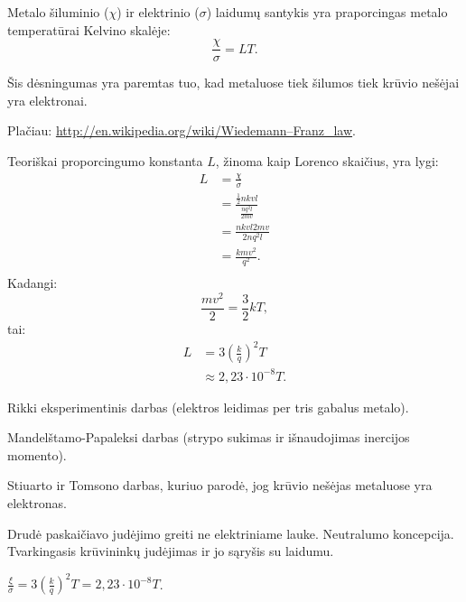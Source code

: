 \begin{defn}
  Metalo šiluminio ($\chi$) ir elektrinio ($\sigma$) laidumų santykis
  yra praporcingas metalo temperatūrai Kelvino skalėje:
  \begin{equation*}
    \frac{\chi}{\sigma} = LT.
  \end{equation*}

  Šis dėsningumas yra paremtas tuo, kad metaluose tiek šilumos tiek
  krūvio nešėjai yra elektronai.

  Plačiau: \url{http://en.wikipedia.org/wiki/Wiedemann–Franz_law}.
\end{defn}

Teoriškai proporcingumo konstanta $L$, žinoma kaip Lorenco skaičius,
yra lygi:
\begin{align*}
  L
  &= \frac{\chi}{\sigma} \\
  &= \frac{\frac{1}{2}nkvl}{\frac{nq^{2}l}{2mv}} \\
  &= \frac{nkvl2mv}{2nq^{2}l} \\
  &= \frac{kmv^{2}}{q^{2}}. \\
\end{align*}
Kadangi:
\begin{equation*}
  \frac{mv^{2}}{2} = \frac{3}{2}kT,
\end{equation*}
tai:
\begin{align*}
  L
  &= 3 \left( \frac{k}{q} \right)^{2}T \\
  &\approx 2,23 \cdot 10^{-8} T.
\end{align*}

\begin{remember}
  \item Rikki eksperimentinis darbas (elektros leidimas per tris
    gabalus metalo).
  \item Mandelštamo-Papaleksi darbas (strypo sukimas ir išnaudojimas
    inercijos momento).
  \item Stiuarto ir Tomsono darbas, kuriuo parodė, jog krūvio nešėjas
    metaluose yra elektronas.
  \item Drudė paskaičiavo judėjimo greiti ne elektriniame lauke.
    Neutralumo koncepcija. Tvarkingasis krūvininkų judėjimas ir
    jo sąryšis su laidumu.
  \item $\frac{\xi}{\sigma} = 3 \left( \frac{k}{q} \right)^{2}T 
    = 2,23 \cdot 10^{-8}T$.
\end{remember}

